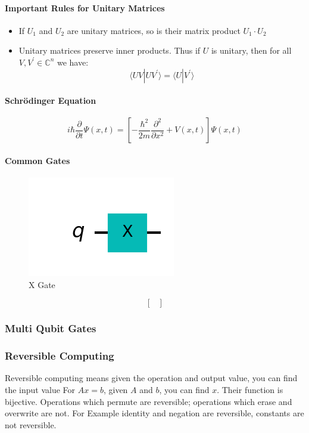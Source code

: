 \documentclass[11pt]{article}
\providecommand{\braket}[2]{\langle#1|#2\rangle}
\theoremstyle{definition}
\theoremstyle{definition}
\begin{document}
\paragraph{Important Rules for Unitary Matrices}
\label{sec:orgaeada06}
\begin{itemize}
\item If \(U_1\) and \(U_2\) are unitary matrices, so is their matrix product \(U_1 \cdot U_2\)
\item Unitary matrices preserve inner products. Thus if \(U\) is unitary, then for all \(V, V^\prime \in \mathbb{C}^n\) we have:
$$\braket{UV}{UV^\prime} = \braket{U}{V^\prime}$$
\end{itemize}

\paragraph{Schrödinger Equation}
\label{sec:orgea3b168}
\begin{equation}
i\hbar\frac{\partial}{\partial t} \Psi(x,t) = \left [ - \frac{\hbar^2}{2m}\frac{\partial^2}{\partial x^2} + V(x,t)\right ] \Psi(x,t)
\end{equation}

\paragraph{Common Gates}
\label{sec:org787618d}
\begin{figure}[htbp]
\centering
\includegraphics[scale=0.8]{./img/x_gate.png}
\caption{X Gate}
\end{figure}

\begin{equation}
\begin{bmatrix}
  \\[0pt]
\end{bmatrix}
\end{equation}

\subsubsection{Multi Qubit Gates}
\label{sec:orgba18d6c}

\subsubsection{Reversible Computing}
\label{sec:org388d21e}
Reversible computing means given the operation and output value, you can
find the input value For \(A x= b\), given \(A\) and \(b\), you can find \(x\).
Their function is bijective.
Operations which permute are reversible; operations which erase and overwrite are not.
For Example identity and negation are reversible, constants are not reversible.
\end{document}
